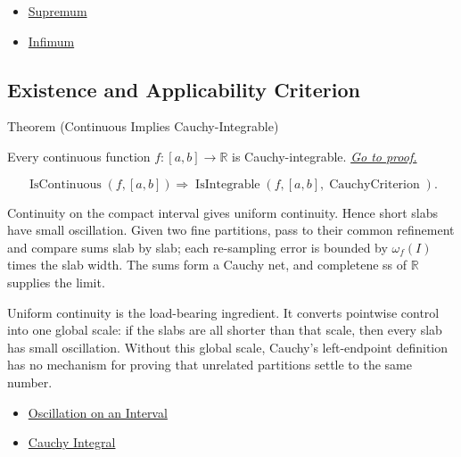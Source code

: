 \begin{dependencies}
\begin{itemize}
  \item \hyperref[def:supremum]{Supremum}
  \item \hyperref[def:infimum]{Infimum}
\end{itemize}
\end{dependencies}

\subsection*{Existence and Applicability Criterion}

\begin{theorembox}{Theorem (Continuous Implies Cauchy-Integrable)}
\begin{theorem}
\label{thm:continuous-cauchy-integrable}
Every continuous function \(f:[a,b]\to\mathbb R\) is Cauchy-integrable.
\hyperref[prf:continuous-cauchy-integrable]{\textit{Go to proof.}}
\end{theorem}
\end{theorembox}

\begin{remark*}
\[
\operatorname{IsContinuous}(f,[a,b])
\Longrightarrow
\operatorname{IsIntegrable}(f,[a,b],\operatorname{CauchyCriterion}).
\]
\end{remark*}

\begin{remark*}[Interpretation]
Continuity on the compact interval gives uniform continuity. Hence short slabs
have small oscillation. Given two fine partitions, pass to their common
refinement and compare sums slab by slab; each re-sampling error is bounded by
\(\omega_f(I)\) times the slab width. The sums form a Cauchy net, and
completene
ss of \(\mathbb R\) supplies the limit.


Uniform continuity is the load-bearing ingredient. It converts pointwise
control into one global scale: if the slabs are all shorter than that scale,
then every slab has small oscillation. Without this global scale, Cauchy's
left-endpoint definition has no mechanism for proving that unrelated
partitions settle to the same number.
\end{remark*}

\begin{dependencies}
\begin{itemize}
  \item \hyperref[def:interval-oscillation-integration]{Oscillation on an Interval}
  \item \hyperref[def:cauchy-integral]{Cauchy Integral}
\end{itemize}
\end{dependencies}

